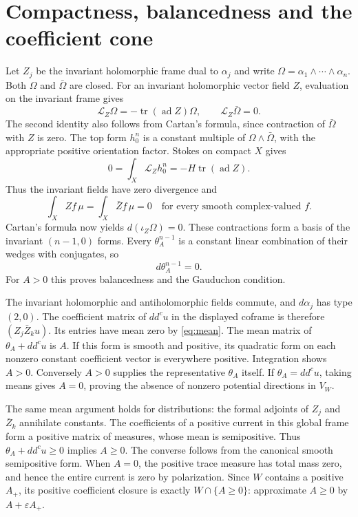 \documentclass[11pt]{article}
\newcommand{\ddc}{dd^c}
\newcommand{\tr}{\operatorname{tr}}
\begin{document}
\section{Compactness, balancedness and the coefficient cone}
Let $Z_j$ be the invariant holomorphic frame dual to $\alpha_j$ and write
$\Omega=\alpha_1\wedge\cdots\wedge\alpha_n$.
Both $\Omega$ and $\bar\Omega$ are closed. For an invariant holomorphic
vector field $Z$, evaluation on the invariant frame gives
\[
 \mathcal L_Z\Omega=-\tr(\operatorname{ad}Z)\Omega,
 \qquad \mathcal L_Z\bar\Omega=0.
\]
The second identity also follows from Cartan's formula, since contraction
of $\bar\Omega$ with $Z$ is zero. The top form $h_0^n$ is a constant
multiple of $\Omega\wedge\bar\Omega$, with the appropriate positive
orientation factor. Stokes on compact $X$ gives
\[
 0=\int_X\mathcal L_Zh_0^n=-H\tr(\operatorname{ad}Z).
\]
Thus the invariant fields have zero divergence and
\begin{equation}\label{eq:mean}
 \int_X Zf\,\mu=\int_X\bar Zf\,\mu=0
 \quad\text{for every smooth complex-valued }f.
\end{equation}
Cartan's formula now yields $d(\iota_Z\Omega)=0$.
These contractions form a basis of the invariant $(n-1,0)$ forms.
Every $\theta_A^{n-1}$ is a constant linear combination of their wedges
with conjugates, so
\begin{equation}\label{eq:balanced}
 d\theta_A^{n-1}=0.
\end{equation}
For $A>0$ this proves balancedness and the Gauduchon condition.

The invariant holomorphic and antiholomorphic fields commute, and
$d\alpha_j$ has type $(2,0)$. The coefficient matrix of $\ddc u$ in the
displayed coframe is therefore $(Z_j\bar Z_k u)$. Its entries have mean
zero by \eqref{eq:mean}. The mean matrix of $\theta_A+\ddc u$ is $A$.
If this form is smooth and positive, its quadratic form on each nonzero
constant coefficient vector is everywhere positive. Integration shows
$A>0$. Conversely $A>0$ supplies the representative $\theta_A$ itself.
If $\theta_A=\ddc u$, taking means gives $A=0$, proving the absence
of nonzero potential directions in $V_W$.

The same mean argument holds for distributions: the formal adjoints
of $Z_j$ and $\bar Z_k$ annihilate constants. The coefficients of a
positive current in this global frame form a positive matrix of measures,
whose mean is semipositive. Thus $\theta_A+\ddc u\geq0$ implies $A\geq0$.
The converse follows from the canonical smooth semipositive form.
When $A=0$, the positive trace measure has total mass zero, and hence
the entire current is zero by polarization. Since $W$ contains a positive
$A_+$, its positive coefficient closure is exactly
$W\cap\{A\geq0\}$: approximate $A\geq0$ by $A+\varepsilon A_+$.
\end{document}
